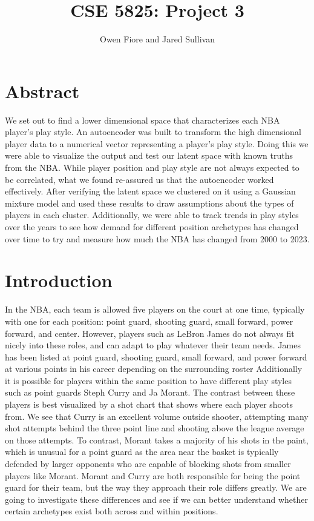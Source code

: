 \documentclass[12pt, letterpaper, titlepage]{article}
\title{CSE 5825: Project 3}
\author{Owen Fiore and Jared Sullivan}
\begin{document}
\maketitle

\section{Abstract}
We set out to find a lower dimensional space that characterizes each NBA player’s play style.  An autoencoder was built to transform the high dimensional player data to a numerical vector representing a player’s play style.  Doing this we were able to visualize the output and test our latent space with known truths from the NBA.  While player position and play style are not always expected to be correlated, what we found re-assured us that the autoencoder worked effectively.  After verifying the latent space we clustered on it using a Gaussian mixture model and used these results to draw assumptions about the types of players in each cluster.  Additionally, we were able to track trends in play styles over the years to see how demand for different position archetypes has changed over time to try and measure how much the NBA has changed from 2000 to 2023.
\section{Introduction}
In the NBA, each team is allowed five players on the court at one time, typically with one for each position: point guard, shooting guard, small forward, power forward, and center.  However, players such as LeBron James do not always fit nicely into these roles, and can adapt to play whatever their team needs. James has been listed at point guard, shooting guard, small forward, and power forward at various points in his career depending on the surrounding roster  Additionally it is possible for players within the same position to have different play styles such as point guards Steph Curry and Ja Morant.  The contrast between these players is best visualized by a shot chart that shows where each player shoots from.  We see that Curry is an excellent volume outside shooter, attempting many shot attempts behind the three point line and shooting above the league average on those attempts.  To contrast, Morant takes a majority of his shots in the paint, which is unusual for a point guard as the area near the basket is typically defended by larger opponents who are capable of blocking shots from smaller players like Morant.  Morant and Curry are both responsible for being the point guard for their team, but the way they approach their role differs greatly.  We are going to investigate these differences and see if we can better understand whether certain archetypes exist both across and within positions.
\end{document}
